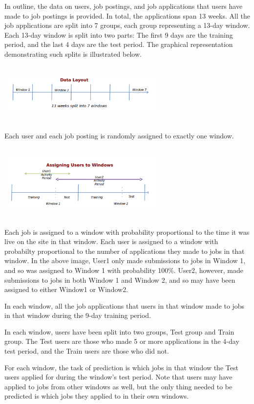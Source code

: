 \documentclass[10pt,twocolumn,letterpaper]{article}
\begin{document}
In outline, the data on users, job postings, and job applications that
users have made to job postings is provided. In total, the applications span
13 weeks. All the job applications are split into 7 groups, each group
representing a 13-day window. Each 13-day window is split into two parts: The
first 9 days are the training period, and the last 4 days are the test period.
The graphical representation demonstrating such splits is illustrated below.

\includegraphics[width=3.3in,height=1.2in]{./dataset/datalayout.png}

Each user and each job posting is randomly assigned to exactly one window.

\includegraphics[width=3.3in,height=1.5in]{./dataset/assignusertowindows.png}

Each job is assigned to a window with probability proportional to the time it
was live on the site in that window. Each user is assigned to a window with
probabilty proportional to the number of applications they made to jobs in
that window. In the above image, User1 only made submissions to jobs in
Window 1, and so was assigned to Window 1 with probability 100\%. User2,
however, made submissions to jobs in both Window 1 and Window 2, and so may
have been assigned to either Window1 or Window2.

In each window, all the job applications that users in that window made to
jobs in that window during the 9-day training period. 

In each window, users have been split into two groups, Test group and Train
group. The Test users are those who made 5 or more applications in the 4-day
test period, and the Train users are those who did not.

For each window, the task of prediction is which jobs in that window the Test
users applied for during the window's test period. Note that users may have
applied to jobs from other windows as well, but the only thing needed to be
predicted is which jobs they applied to in their own windows.
\end{document}
